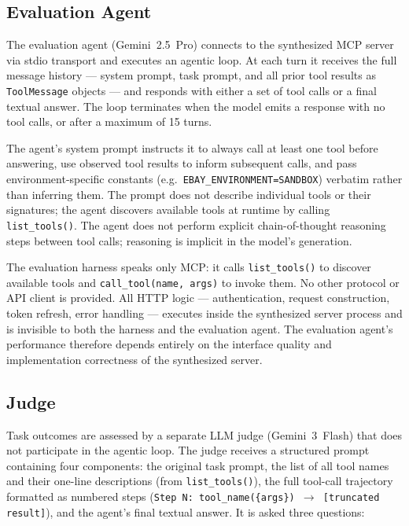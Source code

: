 \documentclass[12pt]{report}
\begin{document}
\subsection{Evaluation Agent}

The evaluation agent (Gemini~2.5~Pro) connects to the synthesized MCP server
via stdio transport and executes an agentic loop. At each turn it receives the
full message history --- system prompt, task prompt, and all prior tool results
as \texttt{ToolMessage} objects --- and responds with either a set of tool
calls or a final textual answer. The loop terminates when the model emits a
response with no tool calls, or after a maximum of 15 turns.

The agent's system prompt instructs it to always call at least one tool before
answering, use observed tool results to inform subsequent calls, and pass
environment-specific constants (e.g.\ \texttt{EBAY\_ENVIRONMENT=SANDBOX})
verbatim rather than inferring them. The prompt does not describe individual
tools or their signatures; the agent discovers available tools at runtime by
calling \texttt{list\_tools()}. The agent does not perform explicit chain-of-thought
reasoning steps between tool calls; reasoning is implicit in the model's
generation.

The evaluation harness speaks only MCP: it calls \texttt{list\_tools()} to
discover available tools and \texttt{call\_tool(name, args)} to invoke them.
No other protocol or API client is provided. All HTTP logic --- authentication,
request construction, token refresh, error handling --- executes inside the
synthesized server process and is invisible to both the harness and the
evaluation agent. The evaluation agent's performance therefore depends entirely
on the interface quality and implementation correctness of the synthesized server.

\subsection{Judge}

Task outcomes are assessed by a separate LLM judge (Gemini~3~Flash) that
does not participate in the agentic loop. The judge receives a structured
prompt containing four components: the original task prompt, the list of all
tool names and their one-line descriptions (from \texttt{list\_tools()}),
the full tool-call trajectory formatted as numbered steps
(\texttt{Step N: tool\_name(\{args\}) $\rightarrow$ [truncated result]}),
and the agent's final textual answer. It is asked three questions:
\end{document}
